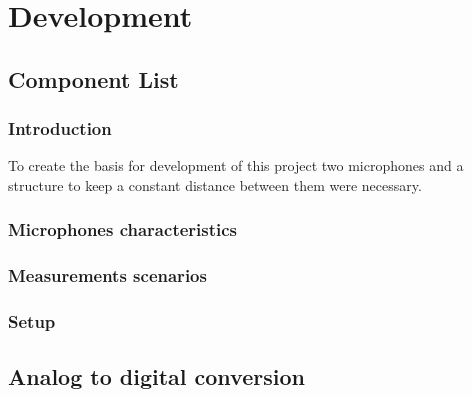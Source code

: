 \chapter{Development}\label{Development}
\section{Component List}
\subsection{Introduction}
To create the basis for development of this project two microphones and a structure to keep a constant distance between them were necessary.  
\subsection{Microphones characteristics}

\subsection{Measurements scenarios}
\subsection{Setup}
\section{Analog to digital conversion}



